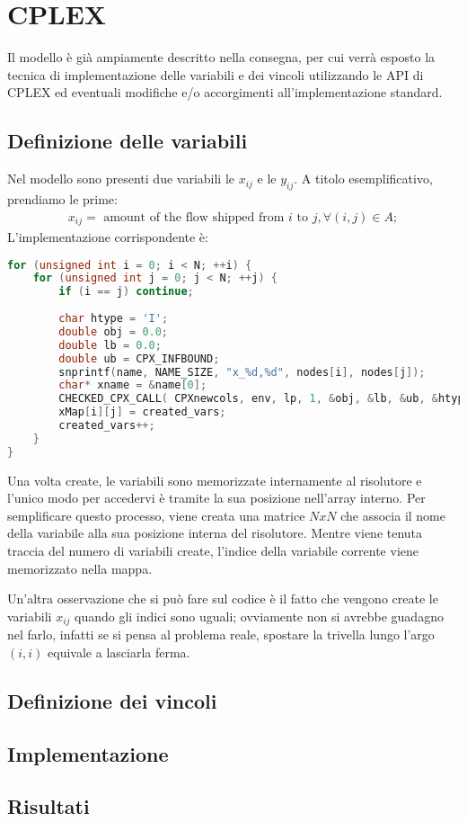 
\section{CPLEX}
Il modello è già ampiamente descritto nella consegna, per cui verrà esposto la tecnica di implementazione delle variabili e dei vincoli utilizzando le API di CPLEX
ed eventuali modifiche e/o accorgimenti all'implementazione standard.

\subsection{Definizione delle variabili}
Nel modello sono presenti due variabili le $x_{ij}$ e le $y_{ij}$.
A titolo esemplificativo, prendiamo le prime:
\begin{gather*}
x_{ij} = \text{ amount of the flow shipped from } i \text{ to } j, ∀ (i,j) \in A;
\end{gather*}
L'implementazione corrispondente è:
\label{code:cplex-variabili}
\begin{lstlisting}[language=C++, caption=Creazione delle variabili $x_{ij}$]
for (unsigned int i = 0; i < N; ++i) {
	for (unsigned int j = 0; j < N; ++j) {
		if (i == j) continue;
		
		char htype = 'I';
		double obj = 0.0;
		double lb = 0.0;
		double ub = CPX_INFBOUND;
		snprintf(name, NAME_SIZE, "x_%d,%d", nodes[i], nodes[j]);
		char* xname = &name[0];
		CHECKED_CPX_CALL( CPXnewcols, env, lp, 1, &obj, &lb, &ub, &htype, &xname );
		xMap[i][j] = created_vars;
		created_vars++;
	}
}
\end{lstlisting}


Una volta create, le variabili sono memorizzate internamente al risolutore e l'unico modo per accedervi è tramite la sua posizione nell'array interno.
Per semplificare questo processo, viene creata una matrice $NxN$ che associa il nome della variabile alla sua posizione interna del risolutore.
Mentre viene tenuta traccia del numero di variabili create, l'indice della variabile corrente viene memorizzato nella mappa.

Un'altra osservazione che si può fare sul codice è il fatto che vengono create le variabili $x_{ij}$ quando gli indici sono uguali;
ovviamente non si avrebbe guadagno nel farlo, infatti se si pensa al problema reale, spostare la trivella lungo l'argo $(i, i)$ equivale a lasciarla ferma.


\subsection{Definizione dei vincoli}

\subsection{Implementazione}




\subsection{Risultati}